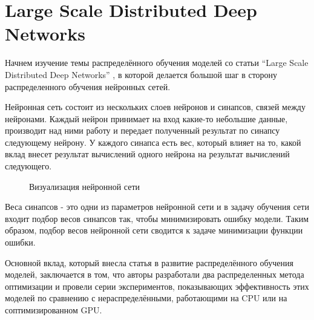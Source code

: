 

\section{Large Scale Distributed Deep Networks}
\indent\setlength{\parindent}{1em} 
Начнем изучение темы распределённого обучения моделей со статьи “Large Scale Distributed Deep Networks” \cite{beginning} , в которой делается большой шаг в сторону распределенного обучения нейронных сетей. 

\indent\setlength{\parindent}{1em} 
Нейронная сеть состоит из нескольких слоев нейронов и синапсов, связей между нейронами. Каждый нейрон принимает на вход какие-то небольшие данные, производит над ними работу и передает полученный результат по синапсу следующему нейрону. У каждого синапса есть вес, который влияет на то, какой вклад внесет результат вычислений одного нейрона на результат вычислений следующего. 
\begin{figure}[h]%
	\centering
	\caption{Визуализация нейронной сети}
	\label{framework} %
\end{figure}

\indent\setlength{\parindent}{1em} 
Веса синапсов - это одни из параметров нейронной сети и в задачу обучения сети входит подбор весов синапсов так, чтобы минимизировать ошибку модели. Таким образом, подбор весов нейронной сети сводится к задаче минимизации функции ошибки.

\indent\setlength{\parindent}{1em} 
Основной вклад, который внесла статья в развитие распределённого обучения моделей, заключается в том, что авторы разработали два распределенных метода оптимизации и провели серии экспериментов, показывающих эффективность этих моделей по сравнению с нераспределёнными, работающими на CPU или на соптимизированном GPU.

